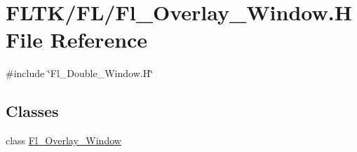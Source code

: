 \hypertarget{_fl___overlay___window_8_h}{}\section{F\+L\+T\+K/\+F\+L/\+Fl\+\_\+\+Overlay\+\_\+\+Window.H File Reference}
\label{_fl___overlay___window_8_h}
{\ttfamily \#include \char`\"{}Fl\+\_\+\+Double\+\_\+\+Window.\+H\char`\"{}}\newline
\subsection*{Classes}
\begin{DoxyCompactItemize}
\item 
class \hyperlink{class_fl___overlay___window}{Fl\+\_\+\+Overlay\+\_\+\+Window}
\end{DoxyCompactItemize}
